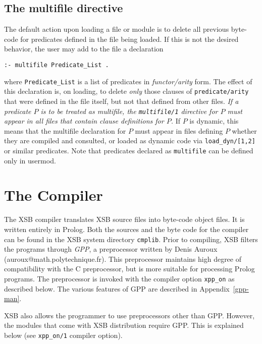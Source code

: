 \subsection{The multifile directive}
The default action upon loading a file or module is to delete all
previous byte-code for predicates defined in the file being loaded.  If this is not
the desired behavior, the user may add to the file a declaration
\begin{center}
{\tt :- multifile Predicate\_List .} \\
\end{center}
where {\tt Predicate\_List} is a list of predicates in {\em
  functor/arity\/} form.  The effect of this declaration is, on
loading, to delete {\em only\/} those clauses of {\tt predicate/arity}
that were defined in the file itself, but not that defined from other
files.  {\em If a predicate $P$ is to be treated as multifile, the
  {\tt multifile/1} directive for $P$ must appear in all files that
  contain clause definitions for $P$.}  If $P$ is dynamic, this means
that the multifile declaration for $P$ must appear in files defining
$P$ whether they are compiled and consulted, or loaded as dynamic code
via {\tt load\_dyn/[1,2]} or similar predicates.  Note that predicates
declared as {\tt multifile} can be defined only in usermod.

\section{The Compiler} \label{the_compiler} 

The XSB compiler translates XSB source files into
byte-code object files.  It is written entirely in Prolog.
Both the sources and the byte code
for the compiler can be found in the XSB system directory
{\tt cmplib}.
%
Prior to compiling, XSB filters the programs through \emph{GPP}, a 
preprocessor written by Denis Auroux (auroux@math.polytechnique.fr).
This preprocessor maintains high degree of compatibility with the C
preprocessor, but is more suitable for processing Prolog programs.
The preprocessor is invoked with the compiler option \verb|xpp_on|
as described below. The various features of GPP are described in
Appendix~\ref{gpp-man}.

XSB also allows the programmer to use preprocessors other than GPP.
However, the modules that come with XSB distribution require GPP.
This is explained below (see \verb|xpp_on/1| compiler option).

